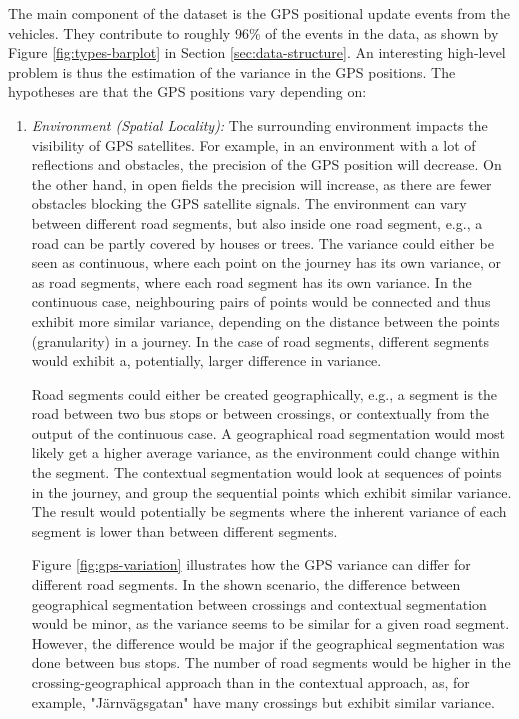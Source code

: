 The main component of the dataset is the GPS positional update events from the vehicles.
They contribute to roughly 96\% of the events in the data, as shown by Figure \ref{fig:types-barplot} in Section \ref{sec:data-structure}.
An interesting high-level problem is thus the estimation of the variance in the GPS positions.
The hypotheses are that the GPS positions vary depending on:
\begin{enumerate}
    \item \textit{Environment (Spatial Locality):} 
    The surrounding environment impacts the visibility of GPS satellites. 
    For example, in an environment with a lot of reflections and obstacles, the precision of the GPS position will decrease.
    On the other hand, in open fields the precision will increase, as there are fewer obstacles blocking the GPS satellite signals.
    The environment can vary between different road segments, but also inside one road segment, e.g., a road can be partly covered by houses or trees.
    The variance could either be seen as continuous, where each point on the journey has its own variance, or as road segments, where each road segment has its own variance.
    In the continuous case, neighbouring pairs of points would be connected and thus exhibit more similar variance, depending on the distance between the points (granularity) in a journey.
    In the case of road segments, different segments would exhibit a, potentially, larger difference in variance.
    
    Road segments could either be created geographically, e.g., a segment is the road between two bus stops or between crossings, or contextually from the output of the continuous case.
    A geographical road segmentation would most likely get a higher average variance, as the environment could change within the segment.
    The contextual segmentation would look at sequences of points in the journey, and group the sequential points which exhibit similar variance.
    The result would potentially be segments where the inherent variance of each segment is lower than between different segments.

    Figure \ref{fig:gps-variation} illustrates how the GPS variance can differ for different road segments.
    In the shown scenario, the difference between geographical segmentation between crossings and contextual segmentation would be minor, as the variance seems to be similar for a given road segment.
    However, the difference would be major if the geographical segmentation was done between bus stops.
    The number of road segments would be higher in the crossing-geographical approach than in the contextual approach, as, for example, "Järnvägsgatan" have many crossings but exhibit similar variance. 
    


\end{enumerate}
